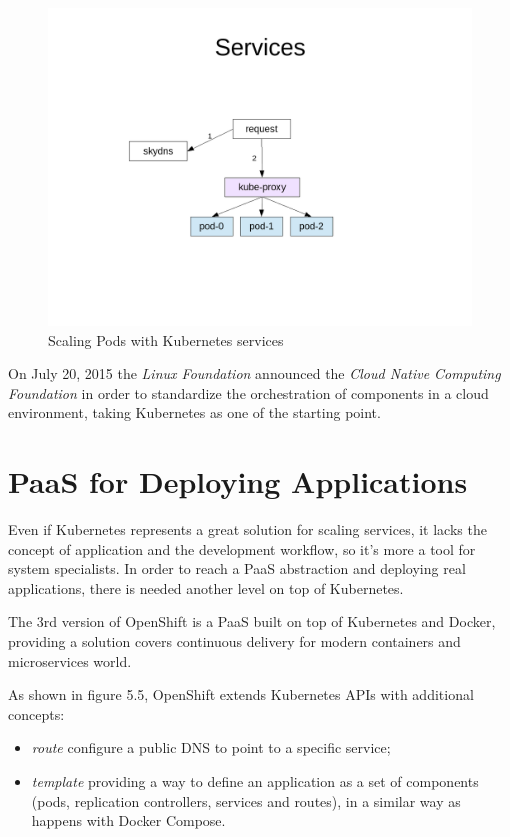 \begin{figure}[htbp]
\centering
\includegraphics{media/ch5-services.png}
\caption{Scaling Pods with Kubernetes services}
\end{figure}

On July 20, 2015 the \textit{Linux Foundation} announced the \textit{Cloud Native Computing Foundation}\cite{CloudNativeComputingFoundation} in order to standardize the orchestration of components in a cloud environment, taking Kubernetes as one of the starting point.

\section{PaaS for Deploying Applications}\label{paas-for-deploying-applications}

Even if Kubernetes represents a great solution for scaling services, it lacks the concept of application and
the development workflow, so it's more a tool for system specialists. In order to reach a PaaS abstraction and deploying real applications, there is needed another level on top of Kubernetes.

The 3rd version of OpenShift is a PaaS built on top of Kubernetes and Docker, providing a solution covers continuous delivery for modern containers and microservices world.

As shown in figure 5.5, OpenShift extends Kubernetes APIs with additional concepts:

\begin{itemize}
\item \textit{route} configure a public DNS to point to a specific service;
\item \textit{template} providing a way to define an application as a set of components (pods, replication controllers, services and routes), in a similar way as happens with Docker Compose.
\end{itemize}

